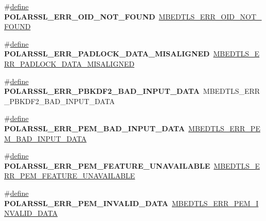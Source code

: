 \begin{DoxyCompactItemize}
\item 
\mbox{\label{compat-1_83_8h_ad8e52f52ec11b6f9f1f29d873e4892e0}} 
\#\hyperlink{structdefine}{define} {\bfseries P\+O\+L\+A\+R\+S\+S\+L\+\_\+\+E\+R\+R\+\_\+\+O\+I\+D\+\_\+\+N\+O\+T\+\_\+\+F\+O\+U\+ND}~\hyperlink{oid_8h_a9a731a2f6abe093916b7b97e79761bdb}{M\+B\+E\+D\+T\+L\+S\+\_\+\+E\+R\+R\+\_\+\+O\+I\+D\+\_\+\+N\+O\+T\+\_\+\+F\+O\+U\+ND}
\item 
\mbox{\label{compat-1_83_8h_a7bf951307cad103081121acec3ddfabf}} 
\#\hyperlink{structdefine}{define} {\bfseries P\+O\+L\+A\+R\+S\+S\+L\+\_\+\+E\+R\+R\+\_\+\+P\+A\+D\+L\+O\+C\+K\+\_\+\+D\+A\+T\+A\+\_\+\+M\+I\+S\+A\+L\+I\+G\+N\+ED}~\hyperlink{padlock_8h_af5c37201b6033a4981bfbf5ebc51ba72}{M\+B\+E\+D\+T\+L\+S\+\_\+\+E\+R\+R\+\_\+\+P\+A\+D\+L\+O\+C\+K\+\_\+\+D\+A\+T\+A\+\_\+\+M\+I\+S\+A\+L\+I\+G\+N\+ED}
\item 
\mbox{\label{compat-1_83_8h_a32afaed6ae1467f54e0ca0d2550329f9}} 
\#\hyperlink{structdefine}{define} {\bfseries P\+O\+L\+A\+R\+S\+S\+L\+\_\+\+E\+R\+R\+\_\+\+P\+B\+K\+D\+F2\+\_\+\+B\+A\+D\+\_\+\+I\+N\+P\+U\+T\+\_\+\+D\+A\+TA}~M\+B\+E\+D\+T\+L\+S\+\_\+\+E\+R\+R\+\_\+\+P\+B\+K\+D\+F2\+\_\+\+B\+A\+D\+\_\+\+I\+N\+P\+U\+T\+\_\+\+D\+A\+TA
\item 
\mbox{\label{compat-1_83_8h_ae178eb5fe3590fc7bb43c16ba1874c2f}} 
\#\hyperlink{structdefine}{define} {\bfseries P\+O\+L\+A\+R\+S\+S\+L\+\_\+\+E\+R\+R\+\_\+\+P\+E\+M\+\_\+\+B\+A\+D\+\_\+\+I\+N\+P\+U\+T\+\_\+\+D\+A\+TA}~\hyperlink{pem_8h_a5db6f46565c6078d041253c3a00d2ae6}{M\+B\+E\+D\+T\+L\+S\+\_\+\+E\+R\+R\+\_\+\+P\+E\+M\+\_\+\+B\+A\+D\+\_\+\+I\+N\+P\+U\+T\+\_\+\+D\+A\+TA}
\item 
\mbox{\label{compat-1_83_8h_a944af87c629fac2a22082a49be42ae3e}} 
\#\hyperlink{structdefine}{define} {\bfseries P\+O\+L\+A\+R\+S\+S\+L\+\_\+\+E\+R\+R\+\_\+\+P\+E\+M\+\_\+\+F\+E\+A\+T\+U\+R\+E\+\_\+\+U\+N\+A\+V\+A\+I\+L\+A\+B\+LE}~\hyperlink{pem_8h_a58b1dec72e6a2586a1bda819ea768ad1}{M\+B\+E\+D\+T\+L\+S\+\_\+\+E\+R\+R\+\_\+\+P\+E\+M\+\_\+\+F\+E\+A\+T\+U\+R\+E\+\_\+\+U\+N\+A\+V\+A\+I\+L\+A\+B\+LE}
\item 
\mbox{\label{compat-1_83_8h_abf162457129ad95e973e02b4c72effdc}} 
\#\hyperlink{structdefine}{define} {\bfseries P\+O\+L\+A\+R\+S\+S\+L\+\_\+\+E\+R\+R\+\_\+\+P\+E\+M\+\_\+\+I\+N\+V\+A\+L\+I\+D\+\_\+\+D\+A\+TA}~\hyperlink{pem_8h_a820cf2ffc66f354f3d8f621cac7b4eda}{M\+B\+E\+D\+T\+L\+S\+\_\+\+E\+R\+R\+\_\+\+P\+E\+M\+\_\+\+I\+N\+V\+A\+L\+I\+D\+\_\+\+D\+A\+TA}

\end{DoxyCompactItemize}
